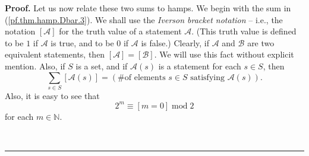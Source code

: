 \documentclass[numbers=enddot,12pt,final,onecolumn,notitlepage]{scrartcl}%
\numberwithin{exer}{subsection}
\theoremstyle{definition}
\newenvironment{proof}[1][Proof]{\noindent\textbf{#1.} }{\ \rule{0.5em}{0.5em}}
\let\sumnonlimits\sum
\renewcommand{\sum}{\sumnonlimits\limits}
\begin{document}
\begin{proof}
Let us now relate these two sums to hamps. We begin with the sum in
(\ref{pf.thm.hamp.Dbar.3}). We shall use the \emph{Iverson bracket notation}
-- i.e., the notation $\left[  \mathcal{A}\right]  $ for the truth value of a
statement $\mathcal{A}$. (This truth value is defined to be $1$ if
$\mathcal{A}$ is true, and to be $0$ if $\mathcal{A}$ is false.) Clearly, if
$\mathcal{A}$ and $\mathcal{B}$ are two equivalent statements, then $\left[
\mathcal{A}\right]  =\left[  \mathcal{B}\right]  $. We will use this fact
without explicit mention. Also, if $S$ is a set, and if $\mathcal{A}\left(
s\right)  $ is a statement for each $s\in S$, then
\begin{equation}
\sum_{s\in S}\left[  \mathcal{A}\left(  s\right)  \right]  =\left(  \#\text{
of elements }s\in S\text{ satisfying }\mathcal{A}\left(  s\right)  \right)  .
\label{pf.thm.hamp.Dbar.rcall}%
\end{equation}
Also, it is easy to see that%
\begin{equation}
2^{m}\equiv\left[  m=0\right]  \operatorname{mod}2 \label{pf.thm.hamp.Dbar.2m}%
\end{equation}
for each $m\in\mathbb{N}$.


\end{proof}
\end{document}
